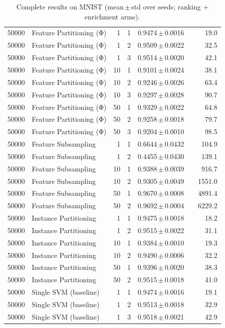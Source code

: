 \begin{table}[ht]
\begin{tabular}{rlrrccr}
50000 & Feature Partitioning (Φ) & 1 & 1 & 0.9474\,$\pm$\,0.0016 &  & 19.0 \\
50000 & Feature Partitioning (Φ) & 1 & 2 & 0.9509\,$\pm$\,0.0022 &  & 32.5 \\
50000 & Feature Partitioning (Φ) & 1 & 3 & 0.9514\,$\pm$\,0.0020 &  & 42.1 \\
50000 & Feature Partitioning (Φ) & 10 & 1 & 0.9101\,$\pm$\,0.0024 &  & 38.1 \\
50000 & Feature Partitioning (Φ) & 10 & 2 & 0.9246\,$\pm$\,0.0026 &  & 63.4 \\
50000 & Feature Partitioning (Φ) & 10 & 3 & 0.9297\,$\pm$\,0.0028 &  & 90.7 \\
50000 & Feature Partitioning (Φ) & 50 & 1 & 0.9329\,$\pm$\,0.0022 &  & 64.8 \\
50000 & Feature Partitioning (Φ) & 50 & 2 & 0.9258\,$\pm$\,0.0018 &  & 79.7 \\
50000 & Feature Partitioning (Φ) & 50 & 3 & 0.9204\,$\pm$\,0.0010 &  & 98.5 \\
50000 & Feature Subsampling & 1 & 1 & 0.6644\,$\pm$\,0.0432 &  & 104.9 \\
50000 & Feature Subsampling & 1 & 2 & 0.4455\,$\pm$\,0.0430 &  & 139.1 \\
50000 & Feature Subsampling & 10 & 1 & 0.9388\,$\pm$\,0.0039 &  & 916.7 \\
50000 & Feature Subsampling & 10 & 2 & 0.9305\,$\pm$\,0.0049 &  & 1551.0 \\
50000 & Feature Subsampling & 50 & 1 & 0.9670\,$\pm$\,0.0008 &  & 4891.4 \\
50000 & Feature Subsampling & 50 & 2 & 0.9692\,$\pm$\,0.0004 &  & 6229.2 \\
50000 & Instance Partitioning & 1 & 1 & 0.9475\,$\pm$\,0.0018 &  & 18.2 \\
50000 & Instance Partitioning & 1 & 2 & 0.9515\,$\pm$\,0.0022 &  & 31.1 \\
50000 & Instance Partitioning & 10 & 1 & 0.9384\,$\pm$\,0.0010 &  & 19.3 \\
50000 & Instance Partitioning & 10 & 2 & 0.9490\,$\pm$\,0.0006 &  & 32.2 \\
50000 & Instance Partitioning & 50 & 1 & 0.9396\,$\pm$\,0.0020 &  & 38.3 \\
50000 & Instance Partitioning & 50 & 2 & 0.9515\,$\pm$\,0.0018 &  & 41.0 \\
50000 & Single SVM (baseline) & 1 & 1 & 0.9474\,$\pm$\,0.0016 &  & 19.1 \\
50000 & Single SVM (baseline) & 1 & 2 & 0.9513\,$\pm$\,0.0018 &  & 32.9 \\
50000 & Single SVM (baseline) & 1 & 3 & 0.9518\,$\pm$\,0.0021 &  & 42.9 \\
\bottomrule
\end{tabular}
\caption{Complete results on MNIST (mean\,$\pm$\,std over seeds; ranking + enrichment arms).}
\label{tab:app_mnist}
\end{table}
